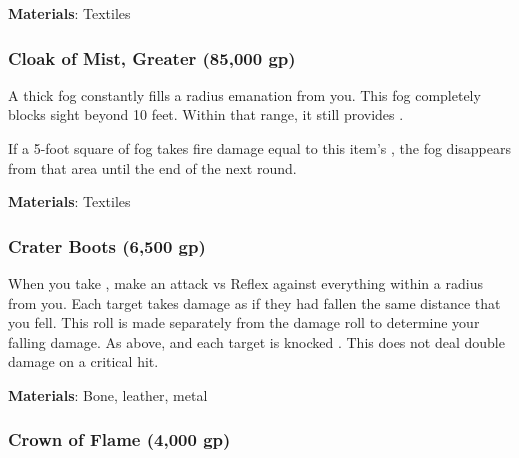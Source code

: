 \vspace{0.25em}
\textbf{Materials}: Textiles


\lowercase{\hypertarget{item:Cloak of Mist, Greater}{}}\label{item:Cloak of Mist, Greater}
\hypertarget{item:Cloak of Mist, Greater}{\subsubsection{Cloak of Mist, Greater\hfill{} (85,000 gp)}}

A thick fog constantly fills a \areamed radius emanation from you.
This fog completely blocks sight beyond 10 feet.
Within that range, it still provides \concealment.

If a 5-foot square of fog takes fire damage equal to this item's , the fog disappears from that area until the end of the next round.



\vspace{0.25em}
\textbf{Materials}: Textiles


\lowercase{\hypertarget{item:Crater Boots}{}}\label{item:Crater Boots}
\hypertarget{item:Crater Boots}{\subsubsection{Crater Boots\hfill{} (6,500 gp)}}

When you take , make an attack vs Reflex against everything within a \areasmall radius from you.
\hit Each target takes damage as if they had fallen the same distance that you fell.
This roll is made separately from the damage roll to determine your falling damage.
\crit As above, and each target is knocked .
This does not deal double damage on a critical hit.



\vspace{0.25em}
\textbf{Materials}: Bone, leather, metal


\lowercase{\hypertarget{item:Crown of Flame}{}}\label{item:Crown of Flame}
\hypertarget{item:Crown of Flame}{\subsubsection{Crown of Flame\hfill{} (4,000 gp)}}

